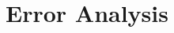 \documentclass{llmxive}
\begin{document}

%
%
%



\section{Error Analysis}
\label{sec:error-analysis}
\end{document}
